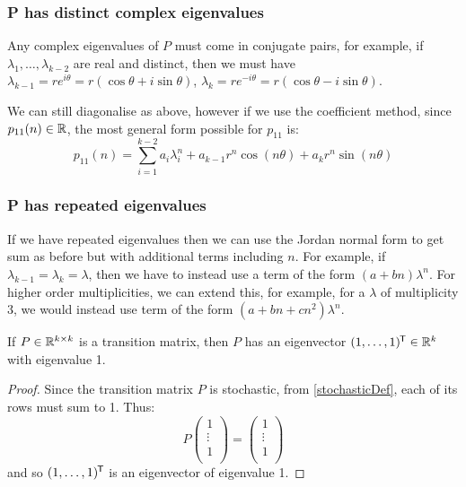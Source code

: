 \documentclass[../main.tex]{subfiles}
\begin{document}
\subsubsection{P has distinct complex eigenvalues}
Any complex eigenvalues of $P$ must come in conjugate pairs, for example, if $\lambda_1, \ldots, \lambda_{k - 2}$ are real and distinct, then we must have $\lambda_{k - 1} = re^{i\theta} = r(\cos \theta + i \sin \theta)$, $\lambda_k = re^{-i\theta} = r(\cos \theta - i \sin \theta)$.

We can still diagonalise as above, however if we use the coefficient method, since $p_{1 1}(n) \in \mathbb{R}$, the most general form possible for $p_{1 1}$ is:
\[
  p_{1 1}(n) = \sum_{i = 1}^{k - 2} a_i \lambda^n_i + a_{k - 1}r^n \cos(n \theta ) + a_k r^n \sin(n \theta)
\]
\subsubsection{P has repeated eigenvalues}
If we have repeated eigenvalues then we can use the Jordan normal form to get sum as before but with additional terms including $n$.
For example, if $\lambda_{k - 1} = \lambda_k = \lambda$, then we have to instead use a term of the form $(a + bn) \lambda^n$.
For higher order multiplicities, we can extend this, for example, for a $\lambda$ of multiplicity 3, we would instead use term of the form $(a + bn + cn^2)\lambda^n$.
\begin{lemma}
  If $P \in \mathbb{R}^{k \times k}$ is a transition matrix, then $P$ has an eigenvector $(1, \ldots, 1)^{{\mkern-1.5mu\mathsf{T}}} \in \mathbb{R}^k$ with eigenvalue 1.
\end{lemma}
\begin{proof}
  Since the transition matrix $P$ is stochastic, from \cref{stochasticDef}, each of its rows must sum to 1.
  Thus:
  \[
    P \begin{pmatrix}
    1 \\
    \vdots \\
    1 \\
    \end{pmatrix} = \begin{pmatrix}
    1 \\
    \vdots \\
    1 \\
    \end{pmatrix}
  \]
  and so $(1, \ldots, 1)^{{\mkern-1.5mu\mathsf{T}}}$ is an eigenvector of eigenvalue 1.
\end{proof}
\end{document}
